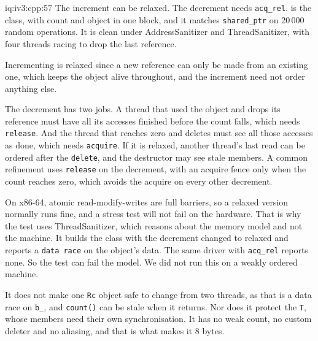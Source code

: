\begin{solution}{iq:iv3:cpp:57}
The increment can be relaxed. The decrement needs \texttt{acq\_rel}.  is the class, with count and object in one block, and it matches \texttt{shared\_ptr} on 20\,000 random operations. It is clean under AddressSanitizer and ThreadSanitizer, with four threads racing to drop the last reference.
\label{lst:iv3:cp:rc}

Incrementing is relaxed since a new reference can only be made from an existing one, which keeps the object alive throughout, and the increment need not order anything else.

The decrement has two jobs. A thread that used the object and drops its reference must have all its accesses finished before the count falls, which needs \texttt{release}. And the thread that reaches zero and deletes must see all those accesses as done, which needs \texttt{acquire}. If it is relaxed, another thread's last read can be ordered after the \texttt{delete}, and the destructor may see stale members. A common refinement uses \texttt{release} on the decrement, with an acquire fence only when the count reaches zero, which avoids the acquire on every other decrement.

On x86-64, atomic read-modify-writes are full barriers, so a relaxed version normally runs fine, and a stress test will not fail on the hardware. That is why the test uses ThreadSanitizer, which reasons about the memory model and not the machine. It builds the class with the decrement changed to relaxed and reports a \texttt{data race} on the object's data. The same driver with \texttt{acq\_rel} reports none. So the test can fail the model. We did not run this on a weakly ordered machine.

It does not make one \texttt{Rc} object safe to change from two threads, as that is a data race on \texttt{b\_}, and \texttt{count()} can be stale when it returns. Nor does it protect the \texttt{T}, whose members need their own synchronisation. It has no weak count, no custom deleter and no aliasing, and that is what makes it 8 bytes.

\end{solution}

